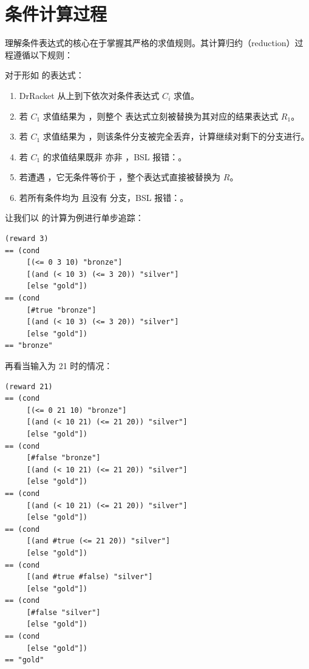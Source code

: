 \section{条件计算过程}
\label{sec:4.2_computing_conditionally}

理解条件表达式的核心在于掌握其严格的求值规则。其计算归约（reduction）过程遵循以下规则：

\begin{notebox}
对于形如  的表达式：
\begin{enumerate}
  \item DrRacket 从上到下依次对条件表达式 $C_i$ 求值。
  \item 若 $C_1$ 求值结果为 ，则整个  表达式立刻被替换为其对应的结果表达式 $R_1$。
  \item 若 $C_1$ 求值结果为 ，则该条件分支被完全丢弃，计算继续对剩下的分支进行。
  \item 若 $C_1$ 的求值结果既非  亦非 ，BSL 报错：。
  \item 若遭遇 \code{[else R]}，它无条件等价于 ，整个表达式直接被替换为 $R$。
  \item 若所有条件均为  且没有  分支，BSL 报错：。
\end{enumerate}
\end{notebox}

让我们以  的计算为例进行单步追踪：
\begin{lstlisting}[language=BSL]
  (reward 3)
== (cond
     [(<= 0 3 10) "bronze"]
     [(and (< 10 3) (<= 3 20)) "silver"]
     [else "gold"])
== (cond
     [#true "bronze"]
     [(and (< 10 3) (<= 3 20)) "silver"]
     [else "gold"])
== "bronze"
\end{lstlisting}

再看当输入为 21 时的情况：
\begin{lstlisting}[language=BSL]
  (reward 21)
== (cond
     [(<= 0 21 10) "bronze"]
     [(and (< 10 21) (<= 21 20)) "silver"]
     [else "gold"])
== (cond
     [#false "bronze"]
     [(and (< 10 21) (<= 21 20)) "silver"]
     [else "gold"])
== (cond
     [(and (< 10 21) (<= 21 20)) "silver"]
     [else "gold"])
== (cond
     [(and #true (<= 21 20)) "silver"]
     [else "gold"])
== (cond
     [(and #true #false) "silver"]
     [else "gold"])
== (cond
     [#false "silver"]
     [else "gold"])
== (cond
     [else "gold"])
== "gold"
\end{lstlisting}

